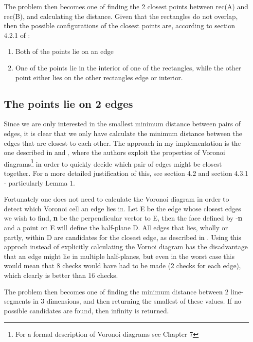 The problem then becomes one of finding the 2 closest points between rec(A) and rec(B), and calculating the distance.
Given that the rectangles do not overlap, then the possible configurations of the closest points are, according to section 4.2.1 of \cite{Larsen99fastproximity}:
\begin{enumerate}
\item Both of the points lie on an edge
\item One of the points lie in the interior of one of the rectangles, while the other point either lies on the other rectangles edge or interior.
\end{enumerate}

\subsection{The points lie on 2 edges}
\label{minimumDistance}
Since we are only interested in the smallest minimum distance between pairs of edges, it is clear that we only have calculate the minimum distance between the edges that are closest to each other. The approach in my implementation is the one described in \cite{larsen00fast} and \cite{Larsen99fastproximity}, where the authors exploit the properties of Voronoi diagrams\footnote{For a formal description of Voronoi diagrams see \cite{compgeom:2008} Chapter 7} in order to quickly decide which pair of edges might be closest together. For a more detailed justification of this, see \cite{larsen00fast} section 4.2 and \cite{Larsen99fastproximity} section 4.3.1 - particularly Lemma 1.

Fortunately one does not need to calculate the Voronoi diagram in order to detect which Voronoi cell an edge lies in. Let E be the edge whose closest edges we wish to find, \textbf{n} be the perpendicular vector to E, then the face defined by -\textbf{n} and a point on E will define the half-plane D. All edges that lies, wholly or partly, within D are candidates for the closest edge, as described in \cite{larsen00fast}. Using this approch instead of explicitly calculating the Vornoi diagram has the disadvantage that an edge might lie in multiple half-planes, but even in the worst case this would mean that 8 checks would have had to be made (2 checks for each edge), which clearly is better than 16 checks.

The problem then becomes one of finding the minimum distance between 2 line-segments in 3 dimensions, and then returning the smallest of these values. If no possible candidates are found, then infinity is returned.

